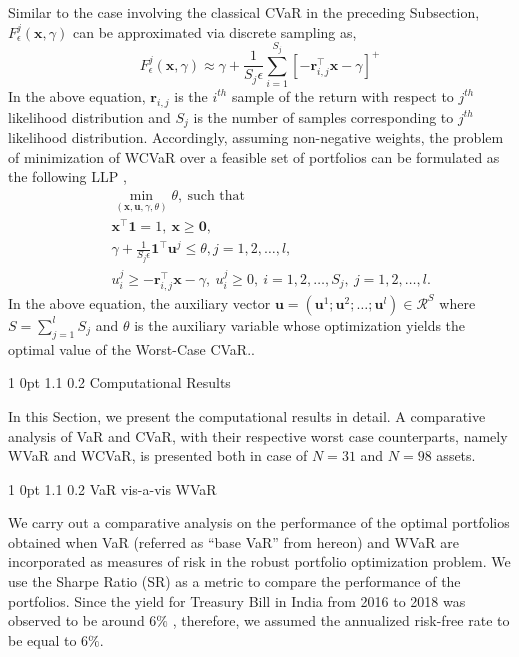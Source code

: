 \documentclass[12pt]{article}
\makeatletter
\numberwithin{equation}{section}
\renewcommand{\section}{
  \@startsection
  {section}%
  {1}%
  {0pt}%
  {1.1\baselineskip}%
  {0.2\baselineskip}%
  {\sc \centering}%
}
\renewcommand{\subsection}{
  \@startsection
  {subsection}%
  {1}%
  {0pt}%
  {1.1\baselineskip}%
  {0.2\baselineskip}%
  {\sc \centering}%
}
\makeatother
\begin{document}
Similar to the case involving the classical CVaR in the preceding Subsection, $\displaystyle{F_{\epsilon}^{j}(\mathbf{x},\gamma)}$ can be approximated via discrete sampling as,
\begin{equation}
F_{\epsilon}^{j}(\mathbf{x},\gamma) \approx \gamma+\frac{1}{S_{j}\epsilon}\sum\limits_{i=1}^{S_{j}}
\left[-\mathbf{r}_{i,j}^{\top}\mathbf{x}-\gamma\right]^{+}
\label{eq:6.10}
\end{equation}
In the above equation, $\mathbf{r}_{i,j}$ is the $i^{th}$ sample of the return with respect to $j^{th}$ likelihood distribution and $S_{j}$ is the number of samples corresponding to $j^{th}$ likelihood distribution. Accordingly, assuming non-negative weights, the problem of minimization of WCVaR over a feasible set of portfolios can be formulated as the following LLP \cite{zhu},
\begin{eqnarray}
&& \min_{(\mathbf{x},\mathbf{u},\gamma,\theta)} \theta,~\text{such that}\\ \nonumber
&& \mathbf{x}^{\top}\mathbf{1}=1,~\mathbf{x} \geq \mathbf{0},\\ \nonumber
&& \gamma + \frac{1}{S_{j} \epsilon} \mathbf{1}^{\top}\mathbf{u}^{j} \leq \theta, j=1,2,\dots,l,\\
&& u_{i}^{j} \geq-\mathbf{r}_{i,j}^{\top}\mathbf{x}-\gamma,~u_{i}^{j} \geq 0,~i=1,2,\dots,S_{j},~j=1,2,\dots,l. \nonumber
\label{eq:6.11}
\end{eqnarray}
In the above equation, the auxiliary vector $\mathbf{u}=(\mathbf{u}^{1};\mathbf{u}^{2};\dots; \mathbf{u}^{l}) \in \mathcal{R}^{S}$ where $\displaystyle{S=\sum\limits_{j=1}^{l}S_{j}}$ and $\theta$ is the auxiliary variable whose optimization yields the optimal value of the Worst-Case CVaR..

\section{Computational Results}
\label{Computational_Results}

In this Section, we present the computational results in detail. A comparative analysis of VaR and CVaR, with their respective worst case counterparts,
namely WVaR and WCVaR, is presented both in case of $N=31$ and $N=98$ assets.

\subsection{VaR vis-a-vis WVaR}

We carry out a comparative analysis on the performance of the optimal portfolios obtained when VaR (referred as ``base VaR'' from hereon) and WVaR are incorporated as measures of risk in the robust portfolio optimization problem. We use the Sharpe Ratio (SR) as a metric to compare the performance of the portfolios. Since the yield for Treasury Bill in India from 2016 to 2018 was observed to be around $6\%$ \cite{rbi}, therefore, we assumed the annualized risk-free rate to be equal to $6\%$.
\end{document}
